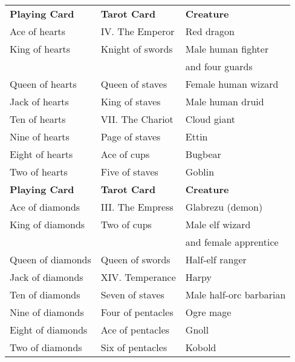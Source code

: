 \begin{tabularx}{\linewidth}{lll}
\textbf{Playing Card}  & \textbf{Tarot Card}    & \textbf{Creature}                       \\
Ace of hearts          & IV. The Emperor        & Red dragon                              \\
King of hearts         & Knight of swords       & Male human fighter \\
                       &                        & and four guards      \\
Queen of hearts        & Queen of staves        & Female human wizard                     \\
Jack of hearts         & King of staves         & Male human druid                        \\
Ten of hearts          & VII. The Chariot       & Cloud giant                             \\
Nine of hearts         & Page of staves         & Ettin                                   \\
Eight of hearts        & Ace of cups            & Bugbear                                 \\
Two of hearts          & Five of staves         & Goblin                                  \\
\textbf{Playing Card}  & \textbf{Tarot Card}    & \textbf{Creature}                       \\
Ace of diamonds        & III. The Empress       & Glabrezu (demon)                        \\
King of diamonds       & Two of cups            & Male elf wizard \\
                       &                        & and female apprentice   \\
Queen of diamonds      & Queen of swords        & Half-elf ranger                         \\
Jack of diamonds       & XIV. Temperance        & Harpy                                   \\
Ten of diamonds        & Seven of staves        & Male half-orc barbarian                 \\
Nine of diamonds       & Four of pentacles      & Ogre mage                               \\
Eight of diamonds      & Ace of pentacles       & Gnoll                                   \\
Two of diamonds        & Six of pentacles       & Kobold                                  \\

\end{tabularx}
